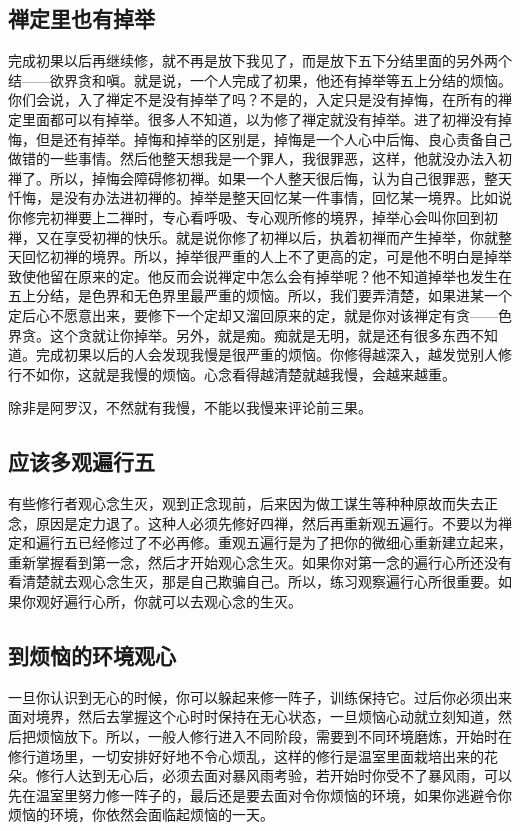 \documentclass{book}
\begin{document}
\subsection{禅定里也有掉举}

完成初果以后再继续修，就不再是放下我见了，而是放下五下分结里面的另外两个结——欲界贪和嗔。就是说，一个人完成了初果，他还有掉举等五上分结的烦恼。你们会说，入了禅定不是没有掉举了吗？不是的，入定只是没有掉悔，在所有的禅定里面都可以有掉举。很多人不知道，以为修了禅定就没有掉举。进了初禅没有掉悔，但是还有掉举。掉悔和掉举的区别是，掉悔是一个人心中后悔、良心责备自己做错的一些事情。然后他整天想我是一个罪人，我很罪恶，这样，他就没办法入初禅了。所以，掉悔会障碍修初禅。如果一个人整天很后悔，认为自己很罪恶，整天忏悔，是没有办法进初禅的。掉举是整天回忆某一件事情，回忆某一境界。比如说你修完初禅要上二禅时，专心看呼吸、专心观所修的境界，掉举心会叫你回到初禅，又在享受初禅的快乐。就是说你修了初禅以后，执着初禅而产生掉举，你就整天回忆初禅的境界。所以，掉举很严重的人上不了更高的定，可是他不明白是掉举致使他留在原来的定。他反而会说禅定中怎么会有掉举呢？他不知道掉举也发生在五上分结，是色界和无色界里最严重的烦恼。所以，我们要弄清楚，如果进某一个定后心不愿意出来，要修下一个定却又溜回原来的定，就是你对该禅定有贪——色界贪。这个贪就让你掉举。另外，就是痴。痴就是无明，就是还有很多东西不知道。完成初果以后的人会发现我慢是很严重的烦恼。你修得越深入，越发觉别人修行不如你，这就是我慢的烦恼。心念看得越清楚就越我慢，会越来越重。

除非是阿罗汉，不然就有我慢，不能以我慢来评论前三果。

\subsection{应该多观遍行五}

有些修行者观心念生灭，观到正念现前，后来因为做工谋生等种种原故而失去正念，原因是定力退了。这种人必须先修好四禅，然后再重新观五遍行。不要以为禅定和遍行五已经修过了不必再修。重观五遍行是为了把你的微细心重新建立起来，重新掌握看到第一念，然后才开始观心念生灭。如果你对第一念的遍行心所还没有看清楚就去观心念生灭，那是自己欺骗自己。所以，练习观察遍行心所很重要。如果你观好遍行心所，你就可以去观心念的生灭。

\subsection{到烦恼的环境观心}

一旦你认识到无心的时候，你可以躲起来修一阵子，训练保持它。过后你必须出来面对境界，然后去掌握这个心时时保持在无心状态，一旦烦恼心动就立刻知道，然后把烦恼放下。所以，一般人修行进入不同阶段，需要到不同环境磨炼，开始时在修行道场里，一切安排好好地不令心烦乱，这样的修行是温室里面栽培出来的花朵。修行人达到无心后，必须去面对暴风雨考验，若开始时你受不了暴风雨，可以先在温室里努力修一阵子的，最后还是要去面对令你烦恼的环境，如果你逃避令你烦恼的环境，你依然会面临起烦恼的一天。
\end{document}
